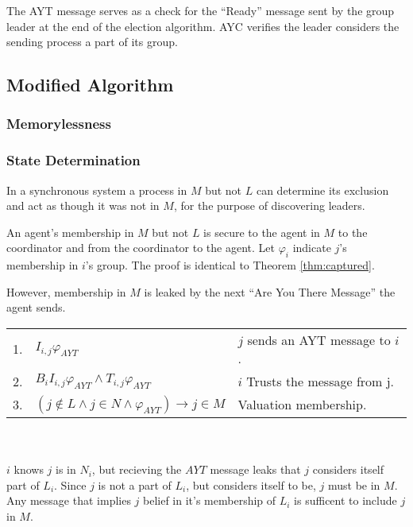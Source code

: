 The \ac{AYT} message serves as a check for the ``Ready'' message sent by the group leader at the end of the election algorithm. \ac{AYC} verifies the leader considers the sending process a part of its group.

\subsection{Modified Algorithm}

\subsubsection{Memorylessness}

\subsubsection{State Determination}

\begin{thm}
In a synchronous system a process in $M$ but not $L$ can determine its exclusion and act as though it was not in $M$, for the purpose of discovering leaders.
\end{thm}

An agent's membership in $M$ but not $L$ is secure to the agent in $M$ to the coordinator and from the coordinator to the agent. Let $\varphi_i$ indicate $j$'s membership in $i$'s group. The proof is identical to Theorem \ref{thm:captured}.

However, membership in $M$ is leaked by the next ``Are You There Message'' the agent sends.

\begin{table}[h!]
\centering
\small
\begin{tabularx}{\linewidth}{l X X}
1. & $I_{i,j} \varphi_{AYT}$ & $j$ sends an AYT message to $i$. \\
2. & $B_i I_{i,j} \varphi_{AYT} \wedge T_{i,j} \varphi_{AYT}$ & $i$ Trusts the message from j. \\
3. & $(j \not \in L \wedge j \in N \wedge \varphi_{AYT}) \rightarrow j \in M $ & Valuation membership. \\ 
\end{tabularx} \\~\\
$i$ knows $j$ is in $N_i$, but recieving the $AYT$ message leaks that $j$ considers itself part of $L_i$. Since $j$ is not a part of $L_i$, but considers itself to be, $j$ must be in $M$. Any message that implies $j$ belief in it's membership of $L_i$ is sufficent to include $j$ in $M$.
\end{table}

